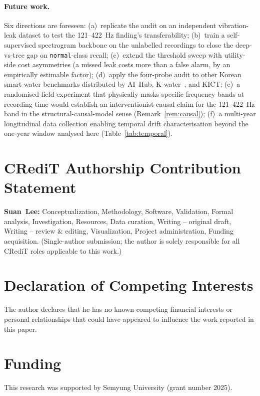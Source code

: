 \documentclass[3p,times,authoryear]{elsarticle}
\theoremstyle{remark}
\begin{document}
\paragraph{Future work.} Six directions are foreseen: (a)~replicate
the audit on an independent vibration-leak dataset to test the
121--422~Hz finding's transferability; (b)~train a
self-supervised spectrogram backbone on the unlabelled
recordings to close the deep-vs-tree gap on
\texttt{normal}-class recall; (c)~extend the
threshold sweep with utility-side cost asymmetries (a missed
leak costs more than a false alarm, by an empirically estimable
factor); (d)~apply the four-probe audit to other Korean smart-water
benchmarks distributed by AI~Hub, K-water~\cite{kwater2022smartwater},
and KICT; (e)~a randomised field experiment that physically masks
specific frequency bands at recording time would establish an
interventionist causal claim for the 121--422~Hz band in the
structural-causal-model sense (Remark~\ref{rem:causal});
(f)~a multi-year longitudinal data collection enabling temporal
drift characterisation beyond the one-year window analysed here
(Table~\ref{tab:temporal}).

\section*{CRediT Authorship Contribution Statement}

\textbf{Suan~Lee:} Conceptualization, Methodology, Software,
Validation, Formal analysis, Investigation, Resources, Data
curation, Writing -- original draft, Writing -- review \&
editing, Visualization, Project administration, Funding
acquisition. (Single-author submission; the author is solely
responsible for all CRediT roles applicable to this work.)

\section*{Declaration of Competing Interests}

The author declares that he has no known competing financial
interests or personal relationships that could have appeared to
influence the work reported in this paper.

\section*{Funding}

This research was supported by Semyung University
(grant number 2025).
\end{document}

